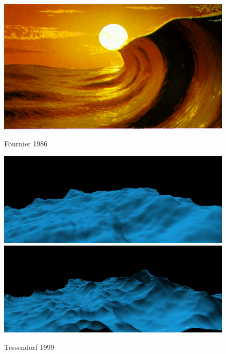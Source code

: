 \begin{figure}
 \hfill
 \subtop
 {
  \includegraphics[scale=0.225]{figures/A_Simple_Model_of_Ocean_Waves_-_Fournier_1986-013.png}
	}
 \caption{Fournier 1986}
\end{figure}

\begin{figure}
 \centering
 \subtop
 {
  \includegraphics[scale=0.125]{figures/Simulating_Ocean_Water-012.png}
 }
 \subtop
 {
  \includegraphics[scale=0.125]{figures/Simulating_Ocean_Water-013.png}
 }
 \caption{Tessendorf 1999}
\end{figure}

